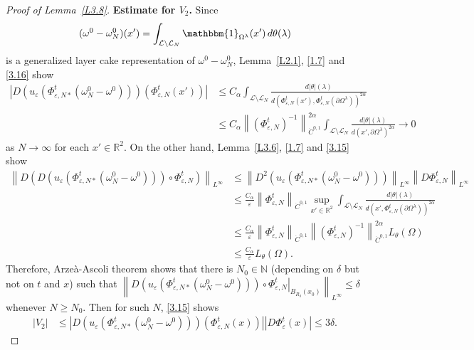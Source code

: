 \documentclass[reqno,centertags,12pt]{amsart}
\theoremstyle{definition}
\numberwithin{equation}{section}
\newcommand{\abs}[1]{\left\lvert#1\right\rvert}
\newcommand{\norm}[1]{\left\|#1\right\|}
\newcommand{\bbN}{{\mathbb{N}}}
\newcommand{\bbR}{{\mathbb{R}}}
\newcommand{\eps}{\varepsilon}
\newcommand{\tht}{\theta}
\begin{document}
\begin{proof}[Proof of Lemma~\ref{L3.8}]
    \textbf{Estimate for $V_{2}$.} Since
    \[
        (\omega^{0} - \omega_{N}^{0})(x')
        = \int_{\mathcal{L}\setminus\mathcal{L}_{N}}
        \mathbbm{1}_{\Omega^{\lambda}}(x')\,d\theta(\lambda)
    \]
    is a generalized layer cake representation of $\omega^{0} - \omega_{N}^{0}$,
    Lemma~\ref{L2.1}, \eqref{1.7} and \eqref{3.16} show
    \begin{align*}
        \abs{D\left(u_{\eps}\left(
            \Phi_{\eps,N*}^{t}(\omega_{N}^{0} - \omega^{0})
        \right)\right)(\Phi_{\eps,N}^{t}(x'))}
        &\leq C_{\alpha}\int_{\mathcal{L}\setminus\mathcal{L}_{N}}
        \frac{d|\theta|(\lambda)}
        {d(\Phi_{\eps,N}^{t}(x'), \Phi_{\eps,N}^{t}(\partial\Omega^{\lambda}))^{2\alpha}} \\
        &\leq C_{\alpha}\norm{(\Phi_{\eps,N}^{t})^{-1}}_{\dot{C}^{0,1}}^{2\alpha}
        \int_{\mathcal{L}\setminus\mathcal{L}_{N}}
        \frac{d|\theta|(\lambda)}
        {d(x',\partial\Omega^{\lambda})^{2\alpha}} \to 0
    \end{align*}
    as $N\to\infty$ for each $x'\in\bbR^{2}$. On the other hand,
    Lemma~\ref{L3.6}, \eqref{1.7} and \eqref{3.15} show
    \begin{align*}
        \norm{D\left(D\left(u_{\eps}\left(
            \Phi_{\eps,N*}^{t}(\omega_{N}^{0} - \omega^{0})
        \right)\right)\circ \Phi_{\eps,N}^{t}\right)}_{L^{\infty}}
        &\leq \norm{D^{2}\left(u_{\eps}\left(
            \Phi_{\eps,N*}^{t}(\omega_{N}^{0} - \omega^{0})
        \right)\right)}_{L^{\infty}}\norm{D\Phi_{\eps,N}^{t}}_{L^{\infty}} \\
        &\leq \frac{C_{\alpha}}{\eps}\norm{\Phi_{\eps,N}^{t}}_{\dot{C}^{0,1}}
        \sup_{x'\in\bbR^{2}}\int_{\mathcal{L}\setminus\mathcal{L}_{N}}
        \frac{d|\theta|(\lambda)}{d(x',\Phi_{\eps,N}^{t}(\partial\Omega^{\lambda}))^{2\alpha}} \\
        &\leq \frac{C_{\alpha}}{\eps}\norm{\Phi_{\eps,N}^{t}}_{\dot{C}^{0,1}}
        \norm{(\Phi_{\eps,N}^{t})^{-1}}_{\dot{C}^{0,1}}^{2\alpha}L_{\tht}(\Omega) \\
        &\leq \frac{C_{\alpha}}{\eps}L_{\tht}(\Omega).
    \end{align*}
    Therefore, Arze\`{a}-Ascoli theorem shows that there is $N_{0}\in\bbN$
    (depending on $\delta$ but not on $t$ and $x$) such that
    $\norm{\left.D\left(u_{\eps}\left(
        \Phi_{\eps,N*}^{t}(\omega_{N}^{0} - \omega^{0})
    \right)\right) \circ \Phi_{\eps,N}^{t}\right|_{B_{R_{\delta}}(x_{0})}}_{L^{\infty}}
    \leq \delta$
    whenever $N\geq N_{0}$.
    Then for such $N$, \eqref{3.15} shows
    \begin{align*}
        \abs{V_{2}} &\leq \abs{D\left(u_{\eps}\left(
            \Phi_{\eps,N*}^{t}(\omega_{N}^{0} - \omega^{0})
        \right)\right)(\Phi_{\eps,N}^{t}(x))}
        \abs{D\Phi_{\eps}^{t}(x)}
        \leq 3\delta.
    \end{align*}


\end{proof}
\end{document}
